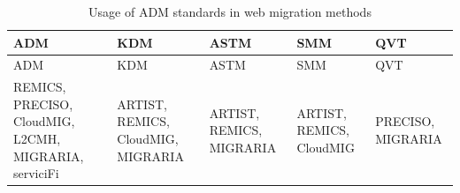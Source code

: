 \hypertarget{tbl:adm-usage}{}
\begin{longtable}[]{@{}lllll@{}}
\caption{\label{tbl:adm-usage}Usage of ADM standards in web migration methods}\tabularnewline
\toprule
\begin{minipage}[b]{0.30\columnwidth}\raggedright
ADM\strut
\end{minipage} & \begin{minipage}[b]{0.19\columnwidth}\raggedright
KDM\strut
\end{minipage} & \begin{minipage}[b]{0.14\columnwidth}\raggedright
ASTM\strut
\end{minipage} & \begin{minipage}[b]{0.14\columnwidth}\raggedright
SMM\strut
\end{minipage} & \begin{minipage}[b]{0.10\columnwidth}\raggedright
QVT\strut
\end{minipage}\tabularnewline
\midrule
\endfirsthead
\toprule
\begin{minipage}[b]{0.30\columnwidth}\raggedright
ADM\strut
\end{minipage} & \begin{minipage}[b]{0.19\columnwidth}\raggedright
KDM\strut
\end{minipage} & \begin{minipage}[b]{0.14\columnwidth}\raggedright
ASTM\strut
\end{minipage} & \begin{minipage}[b]{0.14\columnwidth}\raggedright
SMM\strut
\end{minipage} & \begin{minipage}[b]{0.10\columnwidth}\raggedright
QVT\strut
\end{minipage}\tabularnewline
\midrule
\endhead
\begin{minipage}[t]{0.30\columnwidth}\raggedright
REMICS, PRECISO, CloudMIG, L2CMH, MIGRARIA, serviciFi\strut
\end{minipage} & \begin{minipage}[t]{0.19\columnwidth}\raggedright
ARTIST, REMICS, CloudMIG, MIGRARIA\strut
\end{minipage} & \begin{minipage}[t]{0.14\columnwidth}\raggedright
ARTIST, REMICS, MIGRARIA\strut
\end{minipage} & \begin{minipage}[t]{0.14\columnwidth}\raggedright
ARTIST, REMICS, CloudMIG\strut
\end{minipage} & \begin{minipage}[t]{0.10\columnwidth}\raggedright
PRECISO, MIGRARIA\strut
\end{minipage}\tabularnewline
\bottomrule
\end{longtable}

